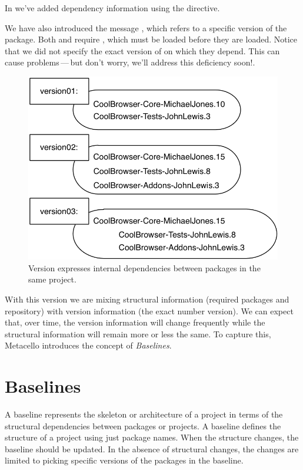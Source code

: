 \documentclass[a4paper,10pt,twoside]{book}
\begin{document}
\noindent
In  we've added dependency information using the  directive.

We have also introduced the  message , which refers to a specific version   of the package. Both  and   require , which must be loaded before they are loaded. 
Notice that we did not specify the exact version of  on which they depend.  This can cause problems\,---\,but don't worry, we'll address this deficiency soon!.

\begin{figure}
\begin{center}
\includegraphics[width=0.6\linewidth]{version03}
\caption{Version  expresses internal dependencies between packages in the same project.\label{fig:version03}}
\end{center}
\end{figure} 


With this version we are mixing structural information (required packages and repository) with version information (the exact number version). 
We can expect that, over time, the version information will change frequently while the structural information will remain more or less the same. 
To capture this, Metacello introduces the concept of \emph{Baselines}.


\section{Baselines}
A baseline represents the skeleton or architecture of a project in terms of the structural dependencies between packages or projects. A baseline defines the structure of a project using just package names. When the structure changes, the baseline should be updated. In the absence of structural changes, the changes are limited to picking specific versions of the packages in the baseline.
\end{document}
